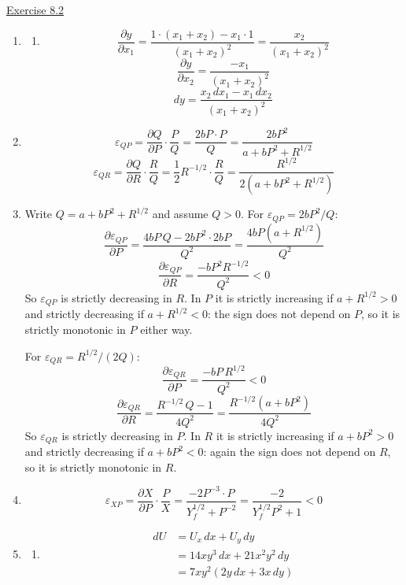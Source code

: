 \underline{Exercise 8.2}
\begin{enumerate}
\item[3.]
\begin{enumerate}
\item[(a)] 
\[\frac{\partial y}{\partial x_{1}}=\frac{1\cdot\left(x_{1}+x_{2}\right)-x_{1}\cdot 1}{\left(x_{1}+x_{2}\right)^{2}}=\frac{x_{2}}{\left(x_{1}+x_{2}\right)^{2}}\]
\[\frac{\partial y}{\partial x_{2}}=\frac{-x_{1}}{\left(x_{1}+x_{2}\right)^{2}}\]
\[dy=\frac{x_{2}\,dx_{1}-x_{1}\,dx_{2}}{\left(x_{1}+x_{2}\right)^{2}}\]

\end{enumerate}

\item[4.] 
\[\varepsilon_{QP}=\frac{\partial Q}{\partial P}\cdot\frac{P}{Q}=\frac{2bP\cdot P}{Q}=\frac{2bP^{2}}{a+bP^{2}+R^{1/2}}\]
\[\varepsilon_{QR}=\frac{\partial Q}{\partial R}\cdot\frac{R}{Q}=\frac{1}{2}R^{-1/2}\cdot\frac{R}{Q}=\frac{R^{1/2}}{2\left(a+bP^{2}+R^{1/2}\right)}\]


\item[5.] Write $Q=a+bP^{2}+R^{1/2}$ and assume $Q>0$. For $\varepsilon_{QP}=2bP^{2}/Q$:
\[\frac{\partial \varepsilon_{QP}}{\partial P}=\frac{4bP\,Q-2bP^{2}\cdot 2bP}{Q^{2}}=\frac{4bP\left(a+R^{1/2}\right)}{Q^{2}}\]
\[\frac{\partial \varepsilon_{QP}}{\partial R}=\frac{-bP^{2}R^{-1/2}}{Q^{2}}<0\]
So $\varepsilon_{QP}$ is strictly decreasing in $R$. In $P$ it is strictly increasing if $a+R^{1/2}>0$ and strictly decreasing if $a+R^{1/2}<0$: the sign does not depend on $P$, so it is strictly monotonic in $P$ either way.

For $\varepsilon_{QR}=R^{1/2}/(2Q)$:
\[\frac{\partial \varepsilon_{QR}}{\partial P}=\frac{-bP\,R^{1/2}}{Q^{2}}<0\]
\[\frac{\partial \varepsilon_{QR}}{\partial R}=\frac{R^{-1/2}\,Q-1}{4Q^{2}}=\frac{R^{-1/2}\left(a+bP^{2}\right)}{4Q^{2}}\]
So $\varepsilon_{QR}$ is strictly decreasing in $P$. In $R$ it is strictly increasing if $a+bP^{2}>0$ and strictly decreasing if $a+bP^{2}<0$: again the sign does not depend on $R$, so it is strictly monotonic in $R$.

\item[6.] 
\[\varepsilon_{XP}=\frac{\partial X}{\partial P}\cdot\frac{P}{X}=\frac{-2P^{-3}\cdot P}{Y_{f}^{1/2}+P^{-2}}=\frac{-2}{Y_{f}^{1/2}P^{2}+1}<0\]


\item[7.]
\begin{enumerate}
\item[(b)] 
\[\begin{aligned}
dU &= U_{x}\,dx+U_{y}\,dy \\
&= 14xy^{3}\,dx+21x^{2}y^{2}\,dy \\
&= 7xy^{2}\left(2y\,dx+3x\,dy\right)
\end{aligned}\]


\end{enumerate}
\end{enumerate}
